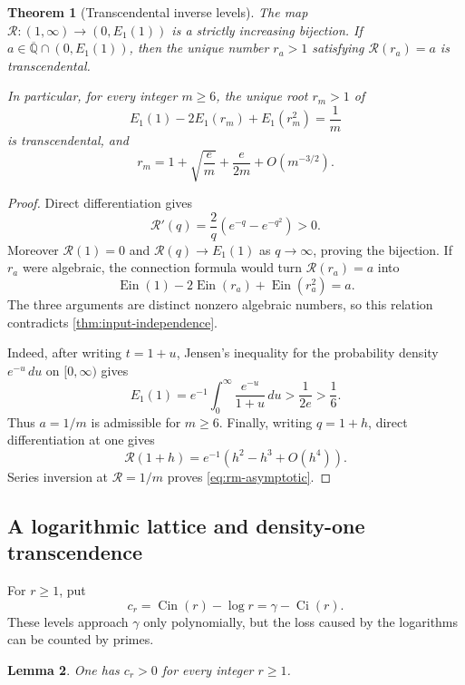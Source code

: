 \documentclass[11pt]{article}
\newtheorem{theorem}{Theorem}[section]
\newtheorem{lemma}[theorem]{Lemma}
\theoremstyle{definition}
\theoremstyle{remark}
\newcommand{\Qbar}{\overline{\mathbb Q}}
\newcommand{\Ein}{\operatorname{Ein}}
\newcommand{\Cin}{\operatorname{Cin}}
\newcommand{\Ci}{\operatorname{Ci}}
\begin{document}
\begin{theorem}[Transcendental inverse levels]
\label{thm:inverse-levels}
The map \(\mathscr R:(1,\infty)\to(0,E_1(1))\) is a strictly increasing
bijection.  If \(a\in\Qbar\cap(0,E_1(1))\), then the unique number
\(r_a>1\) satisfying \(\mathscr R(r_a)=a\) is transcendental.

In particular, for every integer \(m\ge6\), the unique root \(r_m>1\) of
\begin{equation}\label{eq:rm-level}
 E_1(1)-2E_1(r_m)+E_1(r_m^2)=\frac1m
\end{equation}
is transcendental, and
\begin{equation}\label{eq:rm-asymptotic}
 r_m=1+\sqrt{\frac em}+\frac e{2m}+O(m^{-3/2}).
\end{equation}
\end{theorem}

\begin{proof}
Direct differentiation gives
\[
 \mathscr R'(q)=\frac2q(e^{-q}-e^{-q^2})>0.
\]
Moreover \(\mathscr R(1)=0\) and
\(\mathscr R(q)\to E_1(1)\) as \(q\to\infty\), proving the bijection.
If \(r_a\) were algebraic, the connection formula would turn
\(\mathscr R(r_a)=a\) into
\[
 \Ein(1)-2\Ein(r_a)+\Ein(r_a^2)=a.
\]
The three arguments are distinct nonzero algebraic numbers, so this relation
contradicts \cref{thm:input-independence}.

Indeed, after writing \(t=1+u\), Jensen's inequality for the probability
density \(e^{-u}\,du\) on \([0,\infty)\) gives
\[
 E_1(1)=e^{-1}\int_0^\infty\frac{e^{-u}}{1+u}\,du
 >\frac1{2e}>\frac16.
\]
Thus \(a=1/m\) is admissible for \(m\ge6\).  Finally, writing \(q=1+h\),
direct differentiation at one gives
\[
 \mathscr R(1+h)=e^{-1}(h^2-h^3+O(h^4)).
\]
Series inversion at \(\mathscr R=1/m\) proves
\eqref{eq:rm-asymptotic}.
\end{proof}

\subsection{A logarithmic lattice and density-one transcendence}

For \(r\ge1\), put
\begin{equation}\label{eq:cr}
 c_r=\Cin(r)-\log r=\gamma-\Ci(r).
\end{equation}
These levels approach \(\gamma\) only polynomially, but the loss caused by
the logarithms can be counted by primes.

\begin{lemma}\label{lem:cr-positive}
One has \(c_r>0\) for every integer \(r\ge1\).
\end{lemma}
\end{document}
